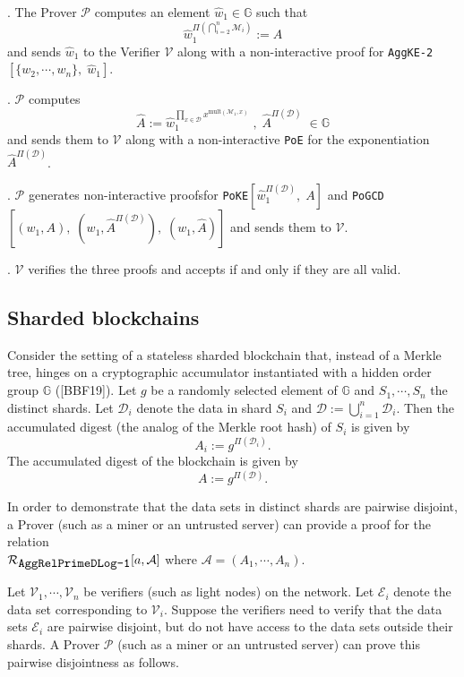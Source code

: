 \documentclass[11pt, lettersize, notitlepage, leqno, footskip=0.6cm]{article}
\newcommand{\pl}{\prod\limits}
\newcommand{\mc}{\mathcal}
\newcommand{\mb}{\mathbb}
\newcommand{\mr}{\mathrm}
\newcommand{\what}{\widehat}
\newcommand{\mP}{\mc{P}}
\newcommand{\V}{\mc{V}}
\newcommand{\vs}{\vspace{-0.15cm}}
\newcommand{\noin}{\noindent}
\newcommand{\nons}{non-interactive proofs}
\numberwithin{equation}{section}
\begin{document}
\begin{prf1}\noin {}. The Prover $\mP$ computes an element $\what{w}_1\in\mb{G}$ such that \vs $$\what{w}_1^{\Pi(\bigcap\limits_{i=2}^n \mc{M}_i)}:= A$$ and sends $\what{w}_1$ to the Verifier $\V$ along with a non-interactive proof for \verb|AggKE-2|$[\{w_2,\cdots,w_n\},\;\what{w}_1]$.

\noin 2. $\mP$ computes \vs $$\what{A}:= \what{w}_1^{\pl_{x\in\mc{D}}x^{\mr{mult}(\mc{M}_1,x)}}\;,\;\what{A}^{\Pi(\mc{D})}\;\in\mb{G}$$ and sends them to $\V$ along with a non-interactive \verb|PoE| for the exponentiation $\what{A}^{\Pi(\mc{D})}$.

\noin 3. $\mP$ generates \nons for \verb|PoKE|$[\what{w}_1^{\Pi(\mc{D})},\;A]$ and \verb|PoGCD|$[(w_1,A),\;(w_1, \what{A}^{\Pi(\mc{D})}),\;(w_1, \what{A})]$ and sends them to $\V$.

\noin 4. $\V$ verifies the three proofs and accepts if and only if they are all valid.\end{prf1}




\bigskip

\subsection{\fontsize{11}{11} Sharded blockchains}

 Consider the setting of a stateless sharded blockchain that, instead of a Merkle tree, hinges on a cryptographic accumulator instantiated with a hidden order group $\mb{G}$ ([BBF19]). Let $g$ be a randomly selected element of $\mb{G}$ and $S_1,\cdots, S_n$ the distinct shards. Let $\mc{D}_i$ denote the data in shard $S_i$ and $\mc{D}:= \bigcup\limits_{i=1}^n \mc{D}_i$. Then the accumulated digest (the analog of the Merkle root hash) of $S_i$ is given by \vs $$A_i:= g^{\Pi(\mc{D}_i)}.$$  The accumulated digest of the blockchain is given by \vs $$A:= g^{\Pi(\mc{D})}.$$

In order to demonstrate that the data sets in distinct shards are pairwise disjoint, a Prover (such as a miner or an untrusted server) can provide a proof for the relation\\ $\mc{R}_{{\protect\verb|AggRelPrimeDLog-1|}}[a, \mc{A}]$ where $\mc{A} = (A_1,\cdots,A_n)$.\vspace{0.2cm}

Let $\V_1,\cdots,\V_n$ be verifiers (such as light nodes) on the network. Let $\mc{E}_i$ denote the data set corresponding to $\V_i$. Suppose the verifiers need to verify that the data sets $\mc{E}_i$ are pairwise disjoint, but do not have access to the data sets outside their shards. A Prover $\mP$ (such as a miner or an untrusted server) can prove this pairwise disjointness as follows.\vspace{0.1cm}
\end{document}

